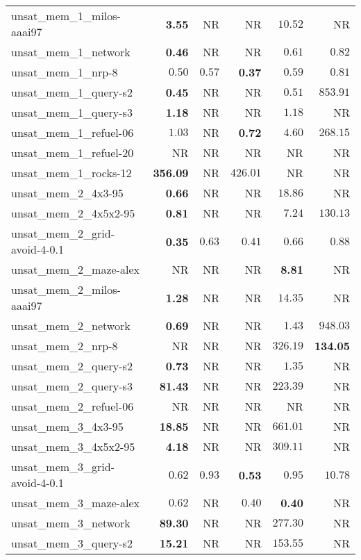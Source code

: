 \begin{tabular}{lrrrrr}
unsat\_mem\_1\_milos-aaai97 & \textbf{3.55} & NR & NR & $10.52$ & NR \\
unsat\_mem\_1\_network & \textbf{0.46} & NR & NR & $0.61$ & $0.82$ \\
unsat\_mem\_1\_nrp-8 & $0.50$ & $0.57$ & \textbf{0.37} & $0.59$ & $0.81$ \\
unsat\_mem\_1\_query-s2 & \textbf{0.45} & NR & NR & $0.51$ & $853.91$ \\
unsat\_mem\_1\_query-s3 & \textbf{1.18} & NR & NR & $1.18$ & NR \\
unsat\_mem\_1\_refuel-06 & $1.03$ & NR & \textbf{0.72} & $4.60$ & $268.15$ \\
unsat\_mem\_1\_refuel-20 & NR & NR & NR & NR & NR \\
unsat\_mem\_1\_rocks-12 & \textbf{356.09} & NR & $426.01$ & NR & NR \\
unsat\_mem\_2\_4x3-95 & \textbf{0.66} & NR & NR & $18.86$ & NR \\
unsat\_mem\_2\_4x5x2-95 & \textbf{0.81} & NR & NR & $7.24$ & $130.13$ \\
unsat\_mem\_2\_grid-avoid-4-0.1 & \textbf{0.35} & $0.63$ & $0.41$ & $0.66$ & $0.88$ \\
unsat\_mem\_2\_maze-alex & NR & NR & NR & \textbf{8.81} & NR \\
unsat\_mem\_2\_milos-aaai97 & \textbf{1.28} & NR & NR & $14.35$ & NR \\
unsat\_mem\_2\_network & \textbf{0.69} & NR & NR & $1.43$ & $948.03$ \\
unsat\_mem\_2\_nrp-8 & NR & NR & NR & $326.19$ & \textbf{134.05} \\
unsat\_mem\_2\_query-s2 & \textbf{0.73} & NR & NR & $1.35$ & NR \\
unsat\_mem\_2\_query-s3 & \textbf{81.43} & NR & NR & $223.39$ & NR \\
unsat\_mem\_2\_refuel-06 & NR & NR & NR & NR & NR \\
unsat\_mem\_3\_4x3-95 & \textbf{18.85} & NR & NR & $661.01$ & NR \\
unsat\_mem\_3\_4x5x2-95 & \textbf{4.18} & NR & NR & $309.11$ & NR \\
unsat\_mem\_3\_grid-avoid-4-0.1 & $0.62$ & $0.93$ & \textbf{0.53} & $0.95$ & $10.78$ \\
unsat\_mem\_3\_maze-alex & $0.62$ & NR & $0.40$ & \textbf{0.40} & NR \\
unsat\_mem\_3\_network & \textbf{89.30} & NR & NR & $277.30$ & NR \\
unsat\_mem\_3\_query-s2 & \textbf{15.21} & NR & NR & $153.55$ & NR \\

\end{tabular}
